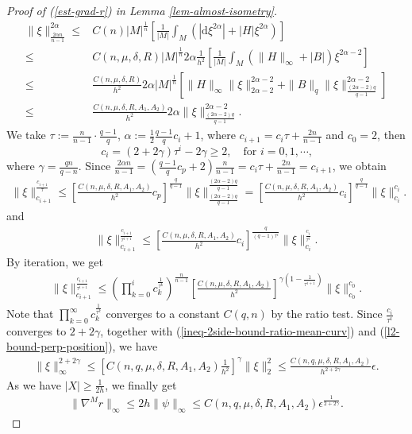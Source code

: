 \documentclass{amsart}
\numberwithin{equation}{section}
\theoremstyle{remark}
\renewcommand{\(}{\left(}
\renewcommand{\)}{\right)}
\renewcommand{\~}{\tilde}
\renewcommand{\-}{\overline}
\renewcommand{\a}{\alpha}
\newcommand{\g}{\gamma}
\renewcommand{\d}{\delta}
\newcommand{\e}{\epsilon}
\newcommand{\mrm}{\mathrm}
\begin{document}
\begin{proof}[Proof of (\ref{est-grad-r}) in Lemma \ref{lem-almost-isometry}]
	\begin{align*}
	\|\xi\|_{\frac{2\a n}{n-1}}^{2\a} \leq & C(n)|M|^\frac{1}{n}\left[\frac{1}{|M|}\int_M \(|\mrm{d}\xi^{2\a}|+|H|\xi^{2\a}\)\right] \\
	\leq &C(n,\mu,\d,R)|M|^\frac{1}{n} 2\a \frac{1}{h^2}\left[\frac{1}{|M|}\int_M \(\|H\|_\infty+|B|\)\xi^{2\a-2}\right]\\
	\leq &\frac{C(n,\mu,\d,R)}{h^2}2\a|M|^\frac{1}{n}\left[ \|H\|_\infty \|\xi\|_{2\a-2}^{2\a-2}+\|B\|_q \|\xi\|_{\frac{(2\a-2)q}{q-1}}^{2\a-2}\right] \\
	\leq &\frac{C(n,\mu,\d,R,A_1,A_2)}{h^2}2\a \|\xi\|_{\frac{(2\a-2)q}{q-1}}^{2\a-2}.
	\end{align*}
	We take $\tau:=\frac{n}{n-1}\cdot \frac{q-1}{q}$, $\a:=\frac{1}{2}\frac{q-1}{q}c_i+1$, where $c_{i+1}=c_i \tau+\frac{2n}{n-1}$ and $c_0=2$, then
	$$
	c_i=\(2+2\g\)\tau^{i}-2\g\geq 2,  \quad \text{for $i=0,1,\cdots$,}
	$$
	where $\g=\frac{qn}{q-n}$. Since $\frac{2\a n}{n-1}=\(\frac{q-1}{q}c_p+2\)\frac{n}{n-1}=c_i \tau+\frac{2n}{n-1}=c_{i+1}$, we obtain
	\begin{align*}
	\|\xi\|_{c_{i+1}}^{\frac{c_{i+1}}{\tau}}\leq \left[\frac{C(n,\mu,\d,R,A_1,A_2)}{h^2}c_p\right]^\frac{q}{q-1} \|\xi\|_{\frac{(2\a-2)q}{q-1}}^\frac{(2\a-2)q}{q-1}= \left[\frac{C(n,\mu,\d,R,A_1,A_2)}{h^2}c_i\right]^\frac{q}{q-1} \|\xi\|_{c_i}^{c_i}.
	\end{align*}
	and
	\begin{align*}
	\|\xi\|_{c_{i+1}}^{\frac{c_{i+1}}{\tau^{i+1}}}\leq \left[\frac{C(n,\mu,\d,R,A_1,A_2)}{h^2}c_i\right]^{\frac{q}{(q-1)\tau^i}} \|\xi\|_{c_i}^{\frac{c_i}{\tau^i}}.
	\end{align*}
	By iteration, we get
	\begin{align*}
	\|\xi\|_{c_{i+1}}^{\frac{c_{i+1}}{\tau^{i+1}}} \leq \(\prod_{k=0}^{i} c_k^{\frac{1}{\tau^k}}\)^\frac{n}{n-1}\left[ \frac{C(n,\mu,\d,R,A_1,A_2)}{h^2} \right]^{\g\(1-\frac{1}{\tau^{i+1}}\)} \|\xi\|_{c_0}^{c_0}.
	\end{align*}
	Note that $\prod_{k=0}^{\infty} c_k^{\frac{1}{\tau^k}}$ converges to a constant $C(q,n)$ by the ratio test. Since $\frac{c_i}{\tau^i}$ converges to $2+2\g$, together with  (\ref{ineq-2side-bound-ratio-mean-curv}) and (\ref{l2-bound-perp-position}), we have
	\begin{align*}
	\|\xi\|_\infty^{2+2\g} \leq \left[ C(n,q,\mu,\d,R,A_1,A_2)\frac{1}{h^2} \right]^{\g}\|\xi\|_2^2 \leq \frac{C(n,q,\mu,\d,R,A_1,A_2)}{h^{2+2\g}}\e.
	\end{align*}
	As we have $|X|\geq \frac{1}{2h}$, we finally get
	\begin{align*}
	\|\nabla^M r\|_\infty \leq 2h\|\psi\|_\infty \leq C(n,q,\mu,\d,R,A_1,A_2) \e^\frac{1}{2+2\g}.
	\end{align*}
\end{proof}
\end{document}
